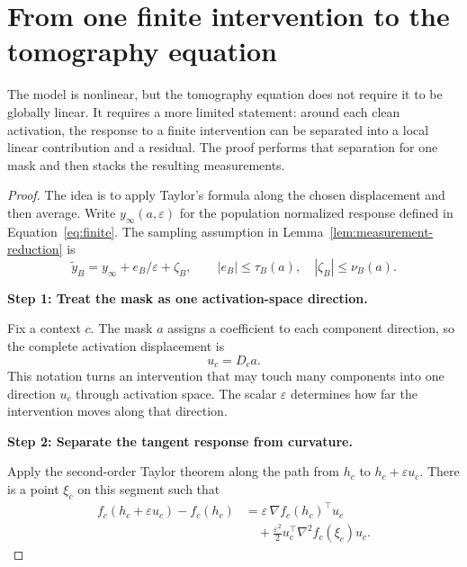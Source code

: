 \documentclass[sigconf,10pt,nonacm,balance=false]{acmart}
\newcommand{\eps}{\varepsilon}
\begin{document}
\clearpage
\appendix


\section{From one finite intervention to the tomography equation}\label{app:proof-measurement}

The model is nonlinear, but the tomography equation does not require it to be globally linear. It requires a more limited statement: around each clean activation, the response to a finite intervention can be separated into a local linear contribution and a residual. The proof performs that separation for one mask and then stacks the resulting measurements.

\begin{proof}

The idea is to apply Taylor's formula along the chosen displacement and then average. Write $y_\infty(a,\eps)$ for the population normalized response defined in Equation~\eqref{eq:finite}. The sampling assumption in Lemma~\ref{lem:measurement-reduction} is
\[
\widetilde y_B=y_\infty+e_B/\eps+\zeta_B,
\qquad |e_B|\le\tau_B(a),\quad |\zeta_B|\le\nu_B(a).
\]

\noindent\textbf{Step 1: Treat the mask as one activation-space direction.}\par

Fix a context $c$. The mask $a$ assigns a coefficient to each component direction, so the complete activation displacement is
\begin{equation}
    u_c=D_ca.
\end{equation}
This notation turns an intervention that may touch many components into one direction $u_c$ through activation space. The scalar $\eps$ determines how far the intervention moves along that direction.

\noindent\textbf{Step 2: Separate the tangent response from curvature.}\par

Apply the second-order Taylor theorem along the path from $h_c$ to $h_c+\eps u_c$. There is a point $\xi_c$ on this segment such that
\begin{equation}
\begin{aligned}
    f_c(h_c+\eps u_c)-f_c(h_c)
    &=
    \eps\,\nabla f_c(h_c)^\top u_c\\
    &\quad+
    \frac{\eps^2}{2}
    u_c^\top\nabla^2 f_c(\xi_c)u_c.
\end{aligned}
\end{equation}


\end{proof}
\end{document}
